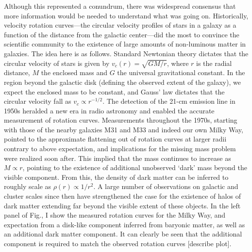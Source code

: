 Although this represented a conundrum, there was widespread consensus that more information would be needed to understand what was going on. Historically, velocity rotation curves---the circular velocity profiles of stars in a galaxy as a function of the distance from the galactic center---did the most to convince the scientific community to the existence of large amounts of non-luminous matter in galaxies. The idea here is as follows. Standard Newtonian theory dictates that the circular velocity of stars is given by $v_c(r) = \sqrt{GM/r}$, where $r$ is the radial distance, $M$ the enclosed mass and $G$ the universal gravitational constant. In the region beyond the galactic disk (defining the observed extent of the galaxy), we expect the enclosed mass to be constant, and Gauss' law dictates that the circular velocity fall as $v_c \propto r^{-1/2}$. The detection of the 21-cm emission line in 1950s heralded a new era in radio astronomy and enabled the accurate measurement of rotation curves. Measurements throughout the 1970s, starting with those of the nearby galaxies M31 and M33 and indeed our own Milky Way, pointed to the approximate flattening out of rotation curves at larger radii contrary to above expectation, and implications for the missing mass problem were realized soon after. This implied that the mass continues to increase as $M \propto r$, pointing to the existence of additional unobserved `dark' mass beyond the visible component. From this, the density of dark matter can be inferred to roughly scale as $\rho(r) \propto 1/r^2$. A large number of observations on galactic and cluster scales since then have strengthened the case for the existence of halos of dark matter extending far beyond the visible extent of these objects. In the left panel of Fig., I show the measured rotation curves for the Milky Way, and expectation from a disk-like component inferred from baryonic matter, as well as an additional dark matter component. It can clearly be seen that the additional component is required to match the observed rotation curves [describe plot].


